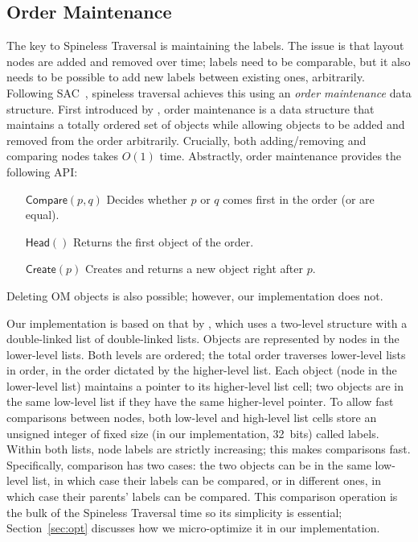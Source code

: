 \subsection{Order Maintenance}

The key to Spineless Traversal is maintaining the labels.
The issue is that layout nodes are added and removed over time;
  labels need to be comparable,
  but it also needs to be possible
  to add new labels between existing ones,
  arbitrarily.
Following SAC~\cite{SAC},
  spineless traversal achieves this using
  an \emph{order maintenance} data structure.
First introduced by \citet{OM},
  order maintenance is a data structure
  that maintains a totally ordered set of objects
  while allowing objects
  to be added and removed from the order arbitrarily.
Crucially, both adding/removing and comparing nodes
  takes $O(1)$ time.
Abstractly, order maintenance provides the following API:

\begin{enumerate}
\setlength{\itemindent}{8em}
  
\item[$\mathsf{Compare}(p, q)$] Decides whether $p$ or $q$ comes first in the order (or are equal).
\item[$\mathsf{Head}()$] Returns the first object of the order.
\item[$\mathsf{Create}(p)$] Creates and returns a new object right after $p$.
\end{enumerate}

\noindent
Deleting OM objects is also possible; however,
  our implementation does not.

Our implementation is based on that by \citet{SOM},
  which uses a two-level structure with
  a double-linked list of double-linked lists.
Objects are represented by nodes in the lower-level lists.
Both levels are ordered;
  the total order traverses lower-level lists in order,
  in the order dictated by the higher-level list.
Each object (node in the lower-level list)
  maintains a pointer to its higher-level list cell;
  two objects are in the same low-level list
  if they have the same higher-level pointer.
To allow fast comparisons between nodes,
  both low-level and high-level list cells store
  an unsigned integer of fixed size
  (in our implementation, 32~bits)
  called labels.
Within both lists, node labels are strictly increasing;
  this makes comparisons fast.
Specifically, comparison has two cases:
  the two objects can be in the same low-level list,
  in which case their labels can be compared,
  or in different ones, in which case
  their parents' labels can be compared.
This comparison operation is
  the bulk of the Spineless Traversal time
  so its simplicity is essential;
  Section~\ref{sec:opt} discusses how we
  micro-optimize it in our implementation.

